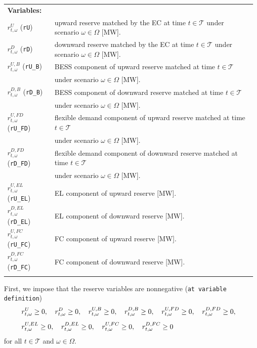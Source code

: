 \documentclass{article}
\begin{document}
\begin{tabularx}{\textwidth}{l l}
    \textbf{Variables:} \\
	$r^{U}_{t, \omega}$ (\verb|rU|) & upward reserve matched by the EC at time $t \in \mathcal{T}$ under scenario $\omega \in \Omega$ [MW]. \\
    $r^{D}_{t, \omega}$ (\verb|rD|) & downward reserve matched by the EC at time $t \in \mathcal{T}$ under scenario $\omega \in \Omega$ [MW]. \\
    $r^{U, B}_{t, \omega}$ (\verb|rU_B|) & BESS component of upward reserve matched at time $t \in \mathcal{T}$ \\
    & under scenario $\omega \in \Omega$ [MW]. \\
    $r^{D, B}_{t, \omega}$ (\verb|rD_B|) & BESS component of downward reserve matched at time $t \in \mathcal{T}$ \\
    & under scenario $\omega \in \Omega$ [MW]. \\
    $r^{U, FD}_{t, \omega}$ (\verb|rU_FD|) & flexible demand component of upward reserve matched at time $t \in \mathcal{T}$ \\
    & under scenario $\omega \in \Omega$ [MW]. \\
    $r^{D, FD}_{t, \omega}$ (\verb|rD_FD|) & flexible demand component of downward reserve matched at time $t \in \mathcal{T}$ \\
    & under scenario $\omega \in \Omega$ [MW]. \\
    $r^{U,EL}_{t,\omega}$ (\verb|rU_EL|) & EL component of upward reserve [MW]. \\
    $r^{D,EL}_{t,\omega}$ (\verb|rD_EL|) & EL component of downward reserve [MW]. \\
    $r^{U,FC}_{t,\omega}$ (\verb|rU_FC|) & FC component of upward reserve [MW]. \\
    $r^{D,FC}_{t,\omega}$ (\verb|rD_FC|) & FC component of downward reserve [MW]. \\
    \\
\end{tabularx}

First, we impose that the reserve variables are nonnegative (\verb|at variable definition|)
\begin{align}
    & r^{U}_{t, \omega} \geq 0, \quad r^{D}_{t, \omega} \geq 0, \quad
      r^{U, B}_{t, \omega} \geq 0, \quad r^{D, B}_{t, \omega} \geq 0, \quad
      r^{U, FD}_{t, \omega} \geq 0, \quad r^{D, FD}_{t, \omega} \geq 0, \notag \\[1ex]
    & r^{U, EL}_{t, \omega} \geq 0, \quad r^{D, EL}_{t, \omega} \geq 0, \quad
      r^{U, FC}_{t, \omega} \geq 0, \quad r^{D, FC}_{t, \omega} \geq 0
    \label{EQ:RVarDef}
\end{align}
for all $t \in \mathcal{T}$ and $\omega \in \Omega$.
\end{document}
